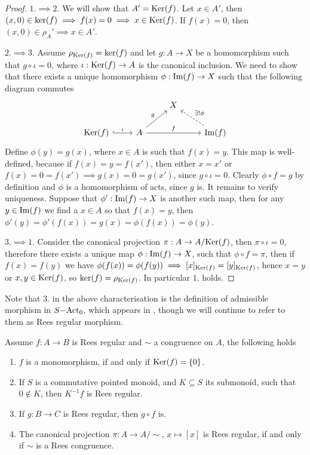 \begin{proof}
    $1.\implies 2.$ We will show that $A'=\mathrm{Ker}(f)$. Let $x\in A'$, then $(x,0)\in\mathrm{ker}(f) \implies f(x)=0 \implies x \in\mathrm{Ker}(f)$. If $f(x)=0$, then 
    $(x,0)\in\rho_A' \implies x\in A'$. \par
    $2.\implies 3.$ Assume $\rho_{\mathrm{Ker}(f)} = \mathrm{ker}(f)$ and let $g: A\to X$ be a homomorphism such that $g\circ\iota = 0$, where
    $\iota: \mathrm{Ker}(f)\to A$ is the canonical inclusion. We need to show that there exists a unique homomorphism $\phi: \mathrm{Im}(f)\to X$ such that
    the following diagram commutes 
    \[\begin{tikzcd}
        && X \\
        {\Kernel{f}} & A && {\Image{f}}
        \arrow["\iota", hook, from=2-1, to=2-2]
        \arrow["g", from=2-2, to=1-3]
        \arrow["f", from=2-2, to=2-4]
        \arrow["{\exists ! \phi}"', dashed, from=2-4, to=1-3]
    \end{tikzcd}\]
    Define $\phi(y) = g(x)$, where $x\in A$ is such that $f(x)=y$. This map is well-defined, because if $f(x)=y=f(x')$, then
    either $x=x'$ or $f(x)=0=f(x') \implies g(x)=0=g(x')$, since $g\circ\iota = 0$. Clearly $\phi\circ f = g$ by definition and $\phi$ 
    is a homomorphism of acts, since $g$ is.
    It remains to verify uniqueness. Suppose that $\phi': \mathrm{Im}(f)\to X$ is another such map, then for any $y\in\mathrm{Im}(f)$ we 
    find a $x\in A$ so that $f(x) = y$, then $\phi'(y) = \phi'(f(x)) = g(x) = \phi(f(x)) = \phi(y)$. \par
    $3. \implies 1.$ Consider the canonical projection $\pi : A \to A/\mathrm{Ker}(f)$, then $\pi\circ\iota = 0$, therefore 
    there exists a unique map $\phi: \mathrm{Im}(f)\to X$, such that $\phi\circ f = \pi$, then if $f(x)=f(y)$ we have 
    $\phi(f(x))=\phi(f(y)) \implies [x]_{\mathrm{Ker}(f)}=[y]_{\mathrm{Ker}(f)}$, hence $x=y$ or $x,y\in\mathrm{Ker}(f)$, so 
    $\mathrm{ker}(f)=\rho_{\mathrm{Ker}(f)}$. In particular $1.$ holds.
\end{proof}
\begin{remark}
    Note that $3.$ in the above characterisation is the definition of admissible morphism in $S\mathrm{-Act}_0$, 
    which appears in \cite{Flores15}, though we will continue to refer to them as Rees regular morphism.
\end{remark}
\begin{proposition}\label{regPropChar}
    Assume $f:A \to B$ is Rees regular and $\sim$ a congruence on $A$, the following holds
    \begin{enumerate}
        \item $f$ is a monomorphism, if and only if $\mathrm{Ker}(f) = \{0\}$.
        \item If $S$ is a commutative pointed monoid, and $K\subseteq S$ its submonoid, such that $0\not\in K$, then $K^{-1}f$ is Rees regular.
        \item If $g: B \to C$ is Rees regular, then $g\circ f$ is.
        \item The canonical projection $\pi : A \to A/\sim$, $x\mapsto [x]$ is Rees regular, if and only if 
        $\sim$ is a Rees congruence.
    \end{enumerate}
\end{proposition}

